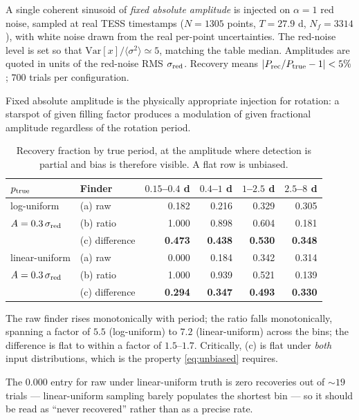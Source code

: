 \documentclass[11pt]{article}
\begin{document}
A single coherent sinusoid of \emph{fixed absolute amplitude} is injected on
$\alpha=1$ red noise, sampled at real TESS timestamps ($N=1305$ points, $T=27.9$ d,
$N_f=3314$), with white noise drawn from the real per-point uncertainties. The red-noise
level is set so that $\mathrm{Var}[x]/\langle\sigma^2\rangle\simeq5$, matching the table
median. Amplitudes are quoted in units of the red-noise RMS $\sigma_{\rm red}$. Recovery
means $|P_{\rm rec}/P_{\rm true}-1| < 5\%$; $700$ trials per configuration.

Fixed absolute amplitude is the physically appropriate injection for rotation: a starspot
of given filling factor produces a modulation of given fractional amplitude regardless of
the rotation period.

\begin{table}[htbp]
\centering
\caption{Recovery fraction by true period, at the amplitude where detection is partial
and bias is therefore visible. A flat row is unbiased.}
\begin{tabular}{llrrrr}
\toprule
$p_{\rm true}$ & Finder & $0.15$--$0.4$ d & $0.4$--$1$ d & $1$--$2.5$ d & $2.5$--$8$ d \\
\midrule
log-uniform    & (a) raw        & 0.182 & 0.216 & 0.329 & 0.305 \\
$A=0.3\,\sigma_{\rm red}$
               & (b) ratio      & 1.000 & 0.898 & 0.604 & 0.181 \\
               & (c) difference & \textbf{0.473} & \textbf{0.438} & \textbf{0.530} & \textbf{0.348} \\
\midrule
linear-uniform & (a) raw        & 0.000 & 0.184 & 0.342 & 0.314 \\
$A=0.3\,\sigma_{\rm red}$
               & (b) ratio      & 1.000 & 0.939 & 0.521 & 0.139 \\
               & (c) difference & \textbf{0.294} & \textbf{0.347} & \textbf{0.493} & \textbf{0.330} \\
\bottomrule
\end{tabular}
\end{table}

The raw finder rises monotonically with period; the ratio falls monotonically, spanning a
factor of $5.5$ (log-uniform) to $7.2$ (linear-uniform) across the bins; the difference is
flat to within a factor of $1.5$--$1.7$. Critically, (c) is flat under \emph{both} input
distributions, which is the property \eqref{eq:unbiased} requires.

The $0.000$ entry for raw under linear-uniform truth is zero recoveries out of $\sim19$
trials --- linear-uniform sampling barely populates the shortest bin --- so it should be
read as ``never recovered'' rather than as a precise rate.
\end{document}
